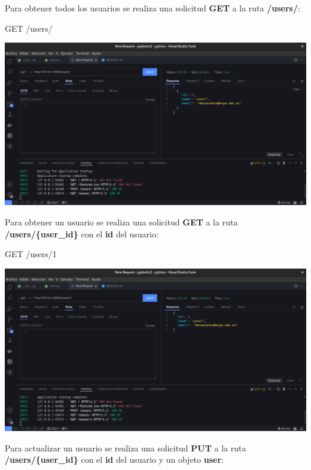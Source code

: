 \documentclass[
  a4paper,
  DIV=11,
  numbers=noendperiod,
  onepage,
  openany]{scrreprt}
\newenvironment{Shaded}{\begin{snugshade}}{\end{snugshade}}
\newcommand{\NormalTok}[1]{\textcolor[rgb]{0.00,0.23,0.31}{#1}}
\begin{document}
Para obtener todos los usuarios se realiza una solicitud \textbf{GET} a
la ruta \textbf{/users/}:

\begin{Shaded}
\begin{Highlighting}[]
\NormalTok{GET /users/}
\end{Highlighting}
\end{Shaded}

\includegraphics{unidades/unidad5/images/paste-22.png}

Para obtener un usuario se realiza una solicitud \textbf{GET} a la ruta
\textbf{/users/\{user\_id\}} con el \textbf{id} del usuario:

\begin{Shaded}
\begin{Highlighting}[]
\NormalTok{GET /users/1}
\end{Highlighting}
\end{Shaded}

\includegraphics{unidades/unidad5/images/paste-23.png}

Para actualizar un usuario se realiza una solicitud \textbf{PUT} a la
ruta \textbf{/users/\{user\_id\}} con el \textbf{id} del usuario y un
objeto \textbf{user}:
\end{document}
